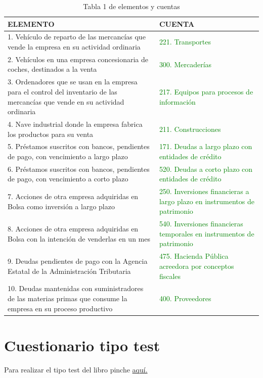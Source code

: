 \documentclass[a4paper,12pt]{article}
\begin{document}
 


    \begin{table}[H]
        \centering
        \begin{tabular}{|p{5cm}|p{5cm}|}
            \hline
            \textbf{ELEMENTO} & \textbf{CUENTA} \\ \hline
            1. Vehículo de reparto de las mercancías que vende la empresa en su actividad ordinaria & \textcolor{green}{221. Transportes} \\ \hline
            2. Vehículos en una empresa concesionaria de coches, destinados a la venta & \textcolor{green}{300. Mercaderías} \\ \hline
            3. Ordenadores que se usan en la empresa para el control del inventario de las mercancías que vende en su actividad ordinaria & \textcolor{green}{217. Equipos para procesos de información} \\ \hline
            4. Nave industrial donde la empresa fabrica los productos para su venta & \textcolor{green}{211. Construcciones} \\ \hline
            5. Préstamos suscritos con bancos, pendientes de pago, con vencimiento a largo plazo & \textcolor{green}{171. Deudas a largo plazo con entidades de crédito} \\ \hline
            6. Préstamos suscritos con bancos, pendientes de pago, con vencimiento a corto plazo & \textcolor{green}{520. Deudas a corto plazo con entidades de crédito} \\ \hline
            7. Acciones de otra empresa adquiridas en Bolsa como inversión a largo plazo & \textcolor{green}{250. Inversiones financieras a largo plazo en instrumentos de patrimonio} \\ \hline
            8. Acciones de otra empresa adquiridas en Bolsa con la intención de venderlas en un mes & \textcolor{green}{540. Inversiones financieras temporales en instrumentos de patrimonio} \\ \hline
            9. Deudas pendientes de pago con la Agencia Estatal de la Administración Tributaria & \textcolor{green}{475. Hacienda Pública acreedora por conceptos fiscales} \\ \hline
            10. Deudas mantenidas con suministradores de las materias primas que consume la empresa en su proceso productivo & \textcolor{green}{400. Proveedores} \\ \hline
        \end{tabular}
        \caption{Tabla 1 de elementos y cuentas}
    \end{table}
    
















\newpage
\section{Cuestionario tipo test}
Para realizar el tipo test del libro pinche \href{https://elblogdeismael.github.io/Asignaturas/Tercer%20A%C3%B1o/CF1/Tests/testT1libro.html}{aquí.}
\end{document}
